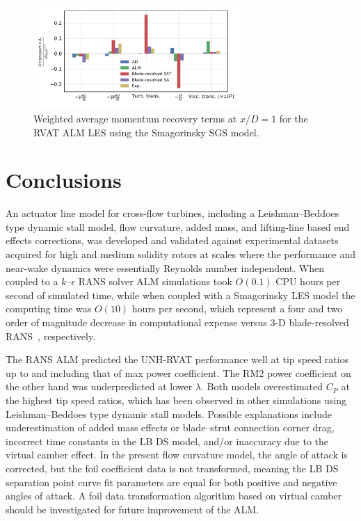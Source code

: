 \documentclass[times]{weauth}
\begin{document}
\begin{figure}
    \centering

    \includegraphics[width=0.7\textwidth]{RVAT-ALM-LES_recovery-bar-chart}

    \caption{Weighted average momentum recovery terms at $x/D=1$ for the RVAT
        ALM LES using the Smagorinsky SGS model.}

    \label{fig:RVAT-ALM-LES-recovery}
\end{figure}


\section{Conclusions}

An actuator line model for cross-flow turbines, including a Leishman--Beddoes
type dynamic stall model, flow curvature, added mass, and lifting-line based end
effects corrections, was developed and validated against experimental datasets
acquired for high and medium solidity rotors at scales where the performance and
near-wake dynamics were essentially Reynolds number independent. When coupled to
a $k$--$\epsilon$ RANS solver ALM simulations took $O(0.1)$ CPU hours per second
of simulated time, while when coupled with a Smagorinsky LES model the computing
time was $O(10)$ hours per second, which represent a four and two order of
magnitude decrease in computational expense versus 3-D blade-resolved
RANS~\cite{Bachant2016-BR-CFD}, respectively.

The RANS ALM predicted the UNH-RVAT performance well at tip speed ratios up to
and including that of max power coefficient. The RM2 power coefficient on the
other hand was underpredicted at lower $\lambda$. Both models overestimated
$C_P$ at the highest tip speed ratios, which has been observed in other
simulations using Leishman--Beddoes type dynamic stall models. Possible
explanations include underestimation of added mass effects or blade--strut
connection corner drag, incorrect time constants in the LB DS model, and/or
inaccuracy due to the virtual camber effect. In the present flow curvature
model, the angle of attack is corrected, but the foil coefficient data is not
transformed, meaning the LB DS separation point curve fit parameters are equal
for both positive and negative angles of attack. A foil data transformation
algorithm based on virtual camber should be investigated for future improvement
of the ALM.
\end{document}
